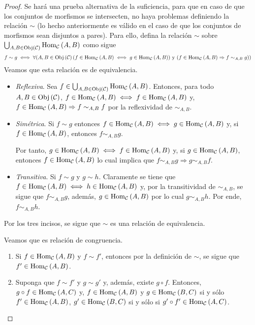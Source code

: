 \documentclass[12pt]{report}
\theoremstyle{largebreak}
\newcommand{\Obj}[1]{\ensuremath{\textup{Obj}\left(#1\right)}}
\newcommand{\Hom}[3]{\ensuremath{\textup{Hom}_{#1}\left(#2,#3\right)}}
\begin{document}
\begin{proof}
        Se hará una prueba alternativa de la suficiencia, para que en caso de que los conjuntos de morfismos se intersecten, no haya problemas definiendo la relación $\sim$ (lo hecho anteriormente es válido en el caso de que los conjuntos de morfismos sean disjuntos a pares). Para ello, defina la relación $\sim$ sobre $\bigcup_{A,B\in\Obj{\mathcal{C}}}\Hom{\mathcal{C}}{A}{B}$ como sigue
        \begin{equation*}
            f\sim g\iff \forall (A,B\in\Obj{\mathcal{C}}(f\in\Hom{\mathcal{C}}{A}{B}\iff g\in\Hom{\mathcal{C}}{A}{B})\textup{ y }(f\in\Hom{\mathcal{C}}{A}{B}\Rightarrow f\sim_{A,B}g))
        \end{equation*}
        Veamos que esta relación es de equivalencia.
        \begin{itemize}
            \item \textit{Reflexiva}. Sea $f\in\bigcup_{A,B\in\Obj{\mathcal{C}}}\Hom{\mathcal{C}}{A}{B}$. Entonces, para todo $A,B\in\Obj{\mathcal{C}}$, $f\in\Hom{\mathcal{C}}{A}{B}\iff f\in\Hom{\mathcal{C}}{A}{B}$ y, $f\in\Hom{\mathcal{C}}{A}{B}\Rightarrow f\sim_{A,B}f$ por la reflexividad de $\sim_{A,B}$.
            \item \textit{Simétrica}. Si $f\sim g$ entonces $f\in\Hom{\mathcal{C}}{A}{B}\iff g\in\Hom{\mathcal{C}}{A}{B}$ y, si $f\in\Hom{\mathcal{C}}{A}{B}$, entonces $f\sim_{A,B}g$.
            
            Por tanto, $g\in\Hom{\mathcal{C}}{A}{B}\iff f\in\Hom{\mathcal{C}}{A}{B}$ y, si $g\in\Hom{\mathcal{C}}{A}{B}$, entonces $f\in\Hom{\mathcal{C}}{A}{B}$ lo cual implica que $f\sim_{A,B}g\Rightarrow g\sim_{A,B}f$.

            \item \textit{Transitiva}. Si $f\sim g$ y $g\sim h$. Claramente se tiene que $f\in\Hom{\mathcal{C}}{A}{B}\iff h\in\Hom{\mathcal{C}}{A}{B}$ y, por la transitividad de $\sim_{A,B}$, se sigue que $f\sim_{A,B}g$, además, $g\in\Hom{\mathcal{C}}{A}{B}$ por lo cual $g\sim_{A,B}h$. Por ende, $f\sim_{A,B}h$.
        \end{itemize}
        Por los tres incisos, se sigue que $\sim$ es una relación de equivalencia.

        Veamos que es relación de congruencia.
        \begin{enumerate}
            \item Si $f\in\Hom{\mathcal{C}}{A}{B}$ y $f\sim f'$, entonces por la definición de $\sim$, se sigue que $f'\in\Hom{\mathcal{C}}{A}{B}$.
            \item Suponga que $f\sim f'$ y $g\sim g'$ y, además, existe $g\circ f$. Entonces, $g\circ f\in\Hom{\mathcal{C}}{A}{C}$ y, $f\in\Hom{\mathcal{C}}{A}{B}$ y $g\in\Hom{\mathcal{C}}{B}{C}$ si y sólo $f'\in\Hom{\mathcal{C}}{A}{B}$, $g'\in\Hom{\mathcal{C}}{B}{C}$ si y sólo si $g'\circ f'\in\Hom{\mathcal{C}}{A}{C}$.
            

\end{enumerate}
\end{proof}
\end{document}
